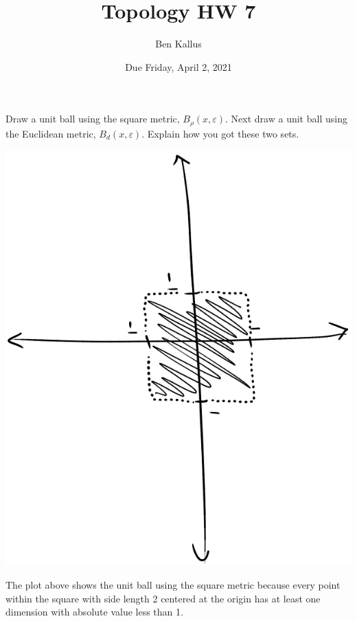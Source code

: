 \documentclass[12pt]{report}
\title{Topology HW 7}
\author{Ben Kallus}
\date{Due Friday, April 2, 2021}
\begin{document}
\maketitle

\noindent Draw a unit ball using the square metric, $B_\rho(x,\varepsilon)$. Next draw a unit ball using the Euclidean metric,  $B_d(x, \varepsilon)$. Explain how you got these two sets. 

\begin{center} \includegraphics[angle=90,scale=.4]{square.png} \end{center}
	The plot above shows the unit ball using the square metric because every point within the square with side length 2 centered at the origin has at least one dimension with absolute value less than 1.
\end{document}
